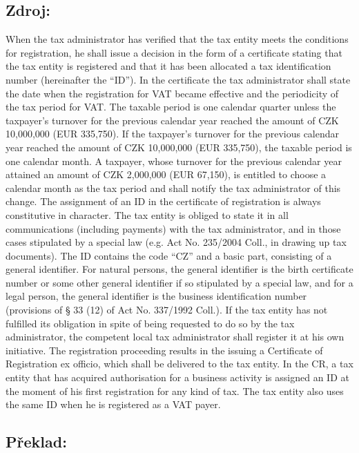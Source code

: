 \documentclass[10pt]{article}
\begin{document}
\subsection*{Zdroj:}

When the tax administrator has verified that the tax entity meets the conditions for registration, he shall issue a decision in the form of a certificate stating that the tax entity is registered and that it has been allocated a tax identification number (hereinafter the “ID”).
In the certificate the tax administrator shall state the date when the registration for VAT became effective and the periodicity of the tax period for VAT.
The taxable period is one calendar quarter unless the taxpayer’s turnover for the previous calendar year reached the amount of CZK 10,000,000 (EUR 335,750).
If the taxpayer’s turnover for the previous calendar year reached the amount of CZK 10,000,000 (EUR 335,750), the taxable period is one calendar month.
A taxpayer, whose turnover for the previous calendar year attained an amount of CZK 2,000,000 (EUR 67,150), is entitled to choose a calendar month as the tax period and shall notify the tax administrator of this change.
The assignment of an ID in the certificate of registration is always constitutive in character.
The tax entity is obliged to state it in all communications (including payments) with the tax administrator, and in those cases stipulated by a special law (e.g. Act No. 235/2004 Coll., in drawing up tax documents).
The ID contains the code “CZ” and a basic part, consisting of a general identifier.
For natural persons, the general identifier is the birth certificate number or some other general identifier if so stipulated by a special law, and for a legal person, the general identifier is the business identification number (provisions of § 33 (12) of Act No. 337/1992 Coll.).
If the tax entity has not fulfilled its obligation in spite of being requested to do so by the tax administrator, the competent local tax administrator shall register it at his own initiative.
The registration proceeding results in the issuing a Certificate of Registration ex officio, which shall be delivered to the tax entity.
In the CR, a tax entity that has acquired authorisation for a business activity is assigned an ID at the moment of his first registration for any kind of tax.
The tax entity also uses the same ID when he is registered as a VAT payer.


\pagebreak

\subsection*{Překlad:}
\end{document}
